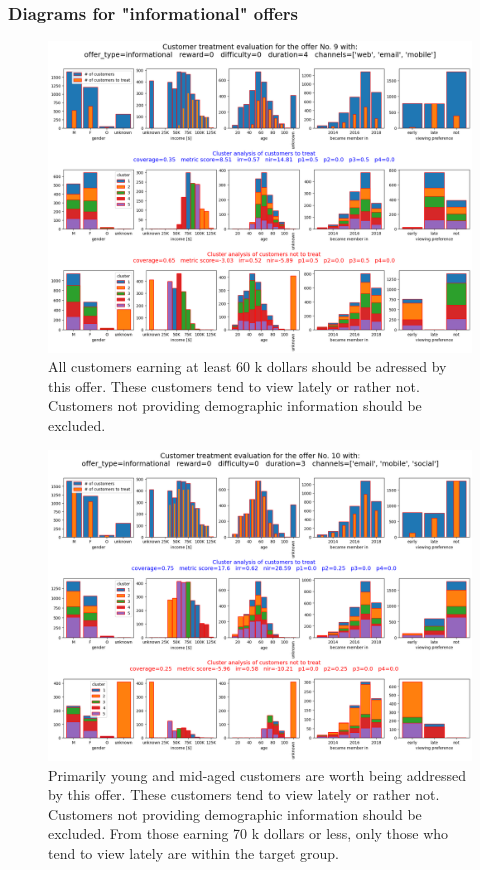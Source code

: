 \documentclass[11pt]{article} %
\begin{document}
\subsubsection{Diagrams for "informational" offers}
\begin{figure}[H]
\includegraphics[height=0.5\textheight]{results/results9.png}
\caption{All customers earning at least 60 k dollars should be adressed by this offer. These customers tend to view lately or rather not. Customers not providing demographic information should be excluded.}
\end{figure}
\begin{figure}[H]
\includegraphics[height=0.5\textheight]{results/results10.png}
\caption{Primarily young and mid-aged customers are worth being addressed by this offer. These customers tend to view lately or rather not. Customers not providing demographic information should be excluded. From those earning 70 k dollars or less, only those who tend to view lately are within the target group.}
\end{figure}
\end{document}
